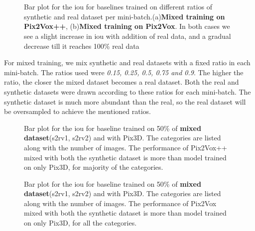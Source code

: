 \begin{figure}[!ht]
    \centering
    \subfloat[][]{\resizebox{0.75\linewidth}{!}{}}\\
    \subfloat[][]{\resizebox{0.75\linewidth}{!}{}}\\
    \caption{Bar plot for the \gls{iou} for baselines trained on different ratios of synthetic and real dataset per mini-batch.(a)\textbf{Mixed training on Pix2Vox++}, (b)\textbf{Mixed training on Pix2Vox}.
    In both cases we see a slight increase in \gls{iou} with addition of real data, and a gradual decrease till it reaches 100\% real data}
    \label{fig:mixed1}
\end{figure}

For mixed training, we mix synthetic and real datasets with a fixed ratio in each mini-batch.
The ratios used were \emph{0.15, 0.25, 0.5, 0.75 and 0.9}.
The higher the ratio, the closer the mixed dataset becomes a real dataset.
Both the real and synthetic datasets were drawn according to these ratios for each mini-batch.
The synthetic dataset is much more abundant than the real, so the real dataset will be oversampled to achieve the mentioned ratios.


\begin{figure}[!ht]
    \centering
    \resizebox{0.65\textwidth}{!}{}
    \caption{Bar plot for the \gls{iou} for baseline  trained on 50\% of \textbf{mixed dataset}(\gls{s2rv1}, \gls{s2rv2}) and with Pix3D.
    The categories are listed along with the number of images.
    The performance of Pix2Vox++ mixed with both the synthetic dataset is more than model trained on only Pix3D, for majority of the categories.
    }
    \label{fig:mixed2}
\end{figure}

\begin{figure}[!ht]
    \centering
    \resizebox{0.65\textwidth}{!}{}
    \caption{Bar plot for the \gls{iou} for baseline  trained on 50\% of \textbf{mixed dataset}(\gls{s2rv1}, \gls{s2rv2}) and with Pix3D.
    The categories are listed along with the number of images.
    The performance of Pix2Vox mixed with both the synthetic dataset is more than model trained on only Pix3D, for all the categories.}
    \label{fig:mixed3}
\end{figure}



